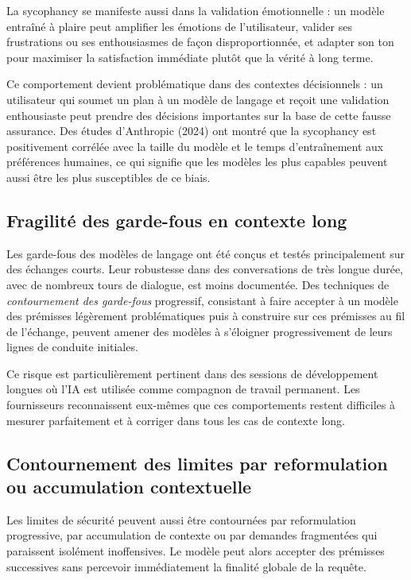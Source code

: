 \documentclass[
  10pt,
  a4paper,
  DIV=11,
  numbers=noendperiod,
  oneside]{scrreprt}
\let\oldemph\emph
\renewcommand{\emph}[1]{\oldemph{\textcolor{cmmgray}{#1}}}
\begin{document}
La sycophancy se manifeste aussi dans la validation émotionnelle : un
modèle entraîné à plaire peut amplifier les émotions de l'utilisateur,
valider ses frustrations ou ses enthousiasmes de façon disproportionnée,
et adapter son ton pour maximiser la satisfaction immédiate plutôt que
la vérité à long terme.

Ce comportement devient problématique dans des contextes décisionnels :
un utilisateur qui soumet un plan à un modèle de langage et reçoit une
validation enthousiaste peut prendre des décisions importantes sur la
base de cette fausse assurance. Des études d'Anthropic (2024) ont montré
que la sycophancy est positivement corrélée avec la taille du modèle et
le temps d'entraînement aux préférences humaines, ce qui signifie que
les modèles les plus capables peuvent aussi être les plus susceptibles
de ce biais.

\subsection{Fragilité des garde-fous en contexte
long}\label{fragilituxe9-des-garde-fous-en-contexte-long}

Les garde-fous des modèles de langage ont été conçus et testés
principalement sur des échanges courts. Leur robustesse dans des
conversations de très longue durée, avec de nombreux tours de dialogue,
est moins documentée. Des techniques de \emph{contournement des
garde-fous} progressif, consistant à faire accepter à un modèle des
prémisses légèrement problématiques puis à construire sur ces prémisses
au fil de l'échange, peuvent amener des modèles à s'éloigner
progressivement de leurs lignes de conduite initiales.

Ce risque est particulièrement pertinent dans des sessions de
développement longues où l'IA est utilisée comme compagnon de travail
permanent. Les fournisseurs reconnaissent eux-mêmes que ces
comportements restent difficiles à mesurer parfaitement et à corriger
dans tous les cas de contexte long.

\subsection{Contournement des limites par reformulation ou accumulation
contextuelle}\label{contournement-des-limites-par-reformulation-ou-accumulation-contextuelle}

Les limites de sécurité peuvent aussi être contournées par reformulation
progressive, par accumulation de contexte ou par demandes fragmentées
qui paraissent isolément inoffensives. Le modèle peut alors accepter des
prémisses successives sans percevoir immédiatement la finalité globale
de la requête.
\end{document}
